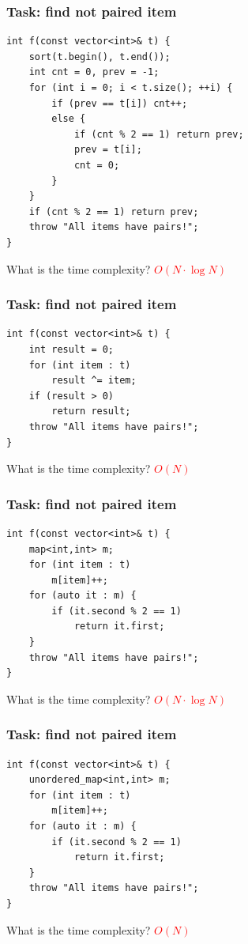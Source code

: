 \documentclass{beamer}
\begin{document}
\begin{frame}[fragile]
    \frametitle{Task: find not paired item}
    \small
    \begin{verbatim}
int f(const vector<int>& t) {
    sort(t.begin(), t.end());
    int cnt = 0, prev = -1;
    for (int i = 0; i < t.size(); ++i) {
        if (prev == t[i]) cnt++;
        else {
            if (cnt % 2 == 1) return prev;
            prev = t[i];
            cnt = 0;
        }
    }
    if (cnt % 2 == 1) return prev;
    throw "All items have pairs!";
}\end{verbatim}

    \begin{block}{}
    What is the time complexity? \pause \textcolor{red}{$O(N \cdot \log N)$}
    \end{block}
\end{frame}

\begin{frame}[fragile]
    \frametitle{Task: find not paired item}
    \begin{verbatim}
int f(const vector<int>& t) {
    int result = 0;
    for (int item : t)
        result ^= item;
    if (result > 0)
        return result;
    throw "All items have pairs!";
}\end{verbatim}

    \begin{block}{}
    What is the time complexity? \pause \textcolor{red}{$O(N)$}
    \end{block}
\end{frame}

\begin{frame}[fragile]
    \frametitle{Task: find not paired item}
    \begin{verbatim}
int f(const vector<int>& t) {
    map<int,int> m;
    for (int item : t)
        m[item]++;
    for (auto it : m) {
        if (it.second % 2 == 1)
            return it.first;
    }
    throw "All items have pairs!";
}\end{verbatim}

    \begin{block}{}
    What is the time complexity? \pause \textcolor{red}{$O(N \cdot \log N)$}
    \end{block}
\end{frame}

\begin{frame}[fragile]
    \frametitle{Task: find not paired item}
    \begin{verbatim}
int f(const vector<int>& t) {
    unordered_map<int,int> m;
    for (int item : t)
        m[item]++;
    for (auto it : m) {
        if (it.second % 2 == 1)
            return it.first;
    }
    throw "All items have pairs!";
}\end{verbatim}

    \begin{block}{}
    What is the time complexity? \pause \textcolor{red}{$O(N)$}
    \end{block}
\end{frame}
\end{document}

